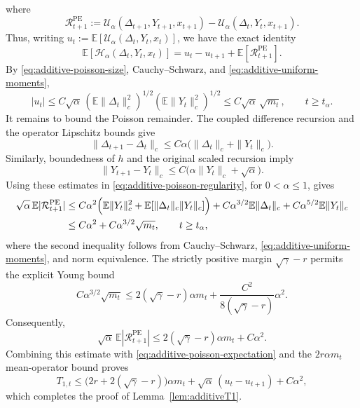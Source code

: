 \documentclass[11pt,letterpaper]{article}
\theoremstyle{plain}
\theoremstyle{definition}
\theoremstyle{remark}
\newcommand{\E}{\mathbb{E}}
\begin{document}
where
\[
    \mathcal R_{t+1}^{\mathrm{PE}}
    :=\mathcal U_\alpha(\Delta_{t+1},Y_{t+1},x_{t+1})
       -\mathcal U_\alpha(\Delta_t,Y_t,x_{t+1}).
\]
Thus, writing
$u_t:=\E[\mathcal U_\alpha(\Delta_t,Y_t,x_t)]$, we have the exact identity
\begin{equation}
\label{eq:additive-poisson-expectation}
    \E[\mathcal H_\alpha(\Delta_t,Y_t,x_t)]
    =u_t-u_{t+1}+\E[\mathcal R_{t+1}^{\mathrm{PE}}].
\end{equation}
By \eqref{eq:additive-poisson-size}, Cauchy--Schwarz, and
\eqref{eq:additive-uniform-moments},
\[
    |u_t|
    \leq C\sqrt\alpha\,
          (\E\|\Delta_t\|_c^2)^{1/2}(\E\|Y_t\|_c^2)^{1/2}
    \leq C\sqrt\alpha\,\sqrt{m_t},
    \qquad t\geq t_\alpha.
\]
It remains to bound the Poisson remainder. The coupled difference
recursion and the operator Lipschitz bounds give
\begin{equation}
\label{eq:additive-delta-increment}
    \|\Delta_{t+1}-\Delta_t\|_c
    \leq C\alpha\bigl(\|\Delta_t\|_c+\|Y_t\|_c\bigr).
\end{equation}
Similarly, boundedness of $h$ and the original scaled recursion imply
\begin{equation}
\label{eq:additive-Y-increment}
    \|Y_{t+1}-Y_t\|_c
    \leq C\bigl(\alpha\|Y_t\|_c+\sqrt\alpha\bigr).
\end{equation}
Using these estimates in \eqref{eq:additive-poisson-regularity}, for
$0<\alpha\leq1$, gives
\begin{align*}
    \sqrt\alpha\,\E|\mathcal R_{t+1}^{\mathrm{PE}}|
    &\leq C\alpha^2\Bigl(
        \E\|Y_t\|_c^2+\E[\|\Delta_t\|_c\|Y_t\|_c]\Bigr)
        +C\alpha^{3/2}\E\|\Delta_t\|_c
        +C\alpha^{5/2}\E\|Y_t\|_c\\
    &\leq C\alpha^2+C\alpha^{3/2}\sqrt{m_t},
    \qquad t\geq t_\alpha,
\end{align*}
where the second inequality follows from Cauchy--Schwarz,
\eqref{eq:additive-uniform-moments}, and norm equivalence. The strictly
positive margin $\sqrt\gamma-r$ permits the explicit Young bound
\[
    C\alpha^{3/2}\sqrt{m_t}
    \leq2(\sqrt\gamma-r)\alpha m_t
        +\frac{C^2}{8(\sqrt\gamma-r)}\alpha^2.
\]
Consequently,
\[
    \sqrt\alpha\,\E|\mathcal R_{t+1}^{\mathrm{PE}}|
    \leq2(\sqrt\gamma-r)\alpha m_t+C\alpha^2.
\]
Combining this estimate with \eqref{eq:additive-poisson-expectation}
and the $2r\alpha m_t$ mean-operator bound proves
\[
    T_{1,t}
    \leq\bigl(2r+2(\sqrt\gamma-r)\bigr)\alpha m_t
        +\sqrt\alpha\,(u_t-u_{t+1})+C\alpha^2,
\]
which completes the proof of
Lemma~\ref{lem:additiveT1}.
\end{document}
